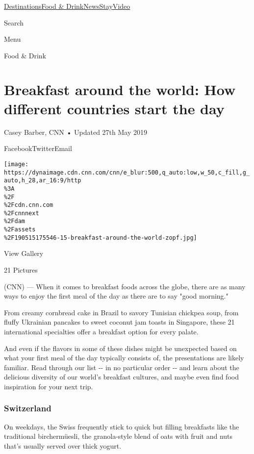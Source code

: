 \href{/}{}\href{/travel}{}

\href{/travel/destinations}{Destinations}\href{/travel/food-and-drink}{Food
\&
Drink}\href{/travel/news}{News}\href{/travel/stay}{Stay}\href{/travel/videos}{Video}

Search

Menu

\href{/travel/food-and-drink}{}

Food \& Drink

\hypertarget{breakfast-around-the-world-how-different-countries-start-the-day}{%
\section{Breakfast around the world: How different countries start the
day}\label{breakfast-around-the-world-how-different-countries-start-the-day}}

Casey Barber, CNN • Updated 27th May 2019

FacebookTwitterEmail

\texttt{[image: https://dynaimage.cdn.cnn.com/cnn/e\_blur:500,q\_auto:low,w\_50,c\_fill,g\_auto,h\_28,ar\_16:9/http\\\%3A\\\%2F\\\%2Fcdn.cnn.com\\\%2Fcnnnext\\\%2Fdam\\\%2Fassets\\\%2F190515175546-15-breakfast-around-the-world-zopf.jpg]}

View Gallery

21 Pictures

(CNN) --- When it comes to breakfast foods across the globe, there are
as many ways to enjoy the first meal of the day as there are to say
"good morning."

From creamy cornbread cake in Brazil to savory Tunisian chickpea soup,
from fluffy Ukrainian pancakes to sweet coconut jam toasts in Singapore,
these 21 international specialties offer a breakfast option for every
palate.

And even if the flavors in some of these dishes might be unexpected
based on what your first meal of the day typically consists of, the
presentations are likely familiar. Read through our list -\/- in no
particular order -\/- and learn about the delicious diversity of our
world's breakfast cultures, and maybe even find food inspiration for
your next trip.

\hypertarget{switzerland}{%
\subsubsection{Switzerland}\label{switzerland}}

On weekdays, the Swiss frequently stick to quick but filling breakfasts
like the traditional birchermüesli, the granola-style blend of oats with
fruit and nuts that's usually served over thick yogurt.

